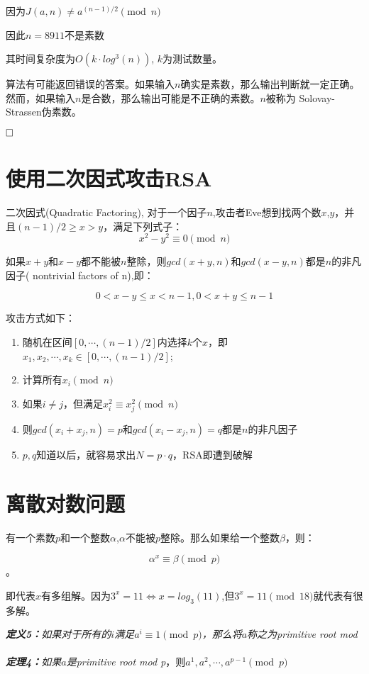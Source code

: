 \documentclass{article}
\begin{document}
因为$J(a,n) \ne a^{(n-1)/2} \pmod{n}$

因此$n = 8911$不是素数

其时间复杂度为$O(k \cdot log^3(n))$, $k$为测试数量。

算法有可能返回错误的答案。如果输入$n$确实是素数，那么输出判断就一定正确。然而，如果输入$n$是合数，那么输出可能是不正确的素数。$n$被称为 Solovay-Strassen伪素数。

$\hfill\square$ 


\section{使用二次因式攻击RSA}
二次因式(Quadratic Factoring), 对于一个因子$n$,攻击者{\color{red}Eve}想到找两个数$x$,$y$，并且$(n-1)/2 \ge x > y$，满足下列式子：
$$x^2 - y^2 \equiv 0 \pmod{n}$$

如果$x+y$和$x-y$都不能被$n$整除，则$gcd(x+y,n)$和$gcd(x-y,n)$都是$n$的非凡因子( nontrivial factors of n),即：


$$0 < x − y ≤ x < n − 1 , 0 < x + y ≤ n − 1$$

攻击方式如下：
\begin{enumerate}
\item 随机在区间$[0,\cdots,(n-1)/2]$内选择$k$个$x$，即$x_1,x_2,\cdots,x_k \in[0,\cdots,(n-1)/2]$;
\item 计算所有$x_i \pmod{n}$
\item 如果$i \ne j$，但满足$x_i^2 \equiv x_j^2 \pmod{n}$
\item 则$gcd(x_i+x_j,n) = p$和$gcd(x_i-x_j,n) = q$都是$n$的非凡因子
\item $p,q$知道以后，就容易求出$N = p \cdot q$，RSA即遭到破解
\end{enumerate}

\section{离散对数问题}
有一个素数$p$和一个整数$\alpha$,$\alpha$不能被$p$整除。那么如果给一个整数$\beta$，则：

$$\alpha^x \equiv \beta \pmod{p}$$。

即代表$x$有多组解。因为$3^x = 11 \Leftrightarrow	 x = log_3(11)$,但$3^x = 11 \pmod{18}$就代表有很多解。

\textit{\textbf{定义5：}如果对于所有的$i$满足$a^i \equiv 1\pmod{p}$，那么将$a$称之为{\color{red}primitive root mod}}
~\\
\textit{\textbf{定理4：}如果$a$是{\color{red}primitive root mod p}}，则$a^1,a^2,\cdots ,a^{p-1} \pmod{p}$
~\\
\end{document}
